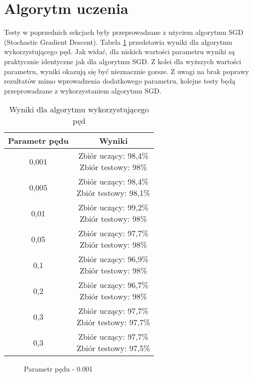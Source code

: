\section{Algorytm uczenia}
Testy w poprzednich sekcjach były przeprowadzane z użyciem algorytmu SGD (Stochastic Gradient Descent). Tabela \ref{table:momentum} przedstawia wyniki dla algorytmu wykorzystującego pęd. Jak widać, dla niskich wartości parametru wyniki są praktycznie identyczne jak dla algorytmu SGD. Z kolei dla wyższych wartości parametru, wyniki okazują się być nieznacznie gorsze. Z uwagi na brak poprawy rezultatów mimo wprowadzenia dodatkowego parametru, kolejne testy będą przeprowadzane z wykorzystaniem algorytmu SGD.
\begin{table}
\centering
\begin{tabular}{|c|c|}
\hline
Parametr pędu & Wyniki \\ \hline
0,001 & \makecell{Zbiór uczący: 98,4\% \\ Zbiór testowy: 98\%} \\ \hline
0,005 & \makecell{Zbiór uczący: 98,4\% \\ Zbiór testowy: 98,1\%} \\ \hline
0,01 & \makecell{Zbiór uczący: 99,2\% \\ Zbiór testowy: 98\%} \\ \hline
0,05 & \makecell{Zbiór uczący: 97,7\% \\ Zbiór testowy: 98\%} \\ \hline
0,1 & \makecell{Zbiór uczący: 96,9\% \\ Zbiór testowy: 98\%} \\ \hline
0,2 & \makecell{Zbiór uczący: 96,7\% \\ Zbiór testowy: 98\%} \\ \hline
0,3 & \makecell{Zbiór uczący: 97,7\% \\ Zbiór testowy: 97,7\%} \\ \hline
0,3 & \makecell{Zbiór uczący: 97,7\% \\ Zbiór testowy: 97,5\%} \\ \hline
\end{tabular}
\caption{Wyniki dla algorytmu wykorzystującego pęd}
\label{table:momentum}
\end{table}

\begin{figure}
\centering
{}
\caption{Parametr pędu - \num{0,001}}
\label{fig:mom_001}
\end{figure}

